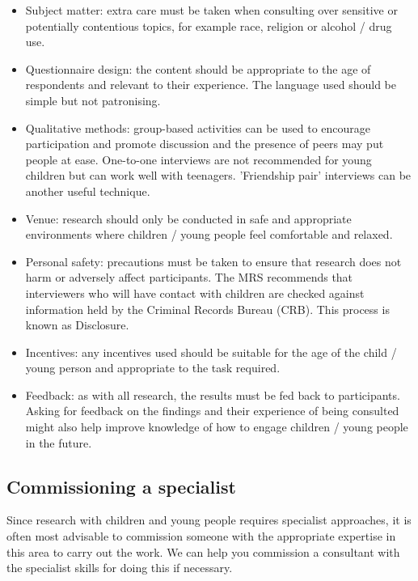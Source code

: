 \begin{itemize}
	\item Subject matter: extra care must be taken when consulting over sensitive or potentially contentious topics, for example race, religion or alcohol / drug use.

	\item Questionnaire design: the content should be appropriate to the age of respondents and relevant to their experience. The language used should be simple but not patronising.

	\item Qualitative methods: group-based activities can be used to encourage participation and promote discussion and the presence of peers may put people at ease. One-to-one interviews are not recommended for young children but can work well with teenagers. 'Friendship pair' interviews can be another useful technique.

	\item Venue: research should only be conducted in safe and appropriate environments where children / young people feel comfortable and relaxed.

	\item Personal safety: precautions must be taken to ensure that research does not harm or adversely affect participants. The MRS recommends that interviewers who will have contact with children are checked against information held by the Criminal Records Bureau (CRB). This process is known as Disclosure.

	\item Incentives: any incentives used should be suitable for the age of the child / young person and appropriate to the task required.

	\item Feedback: as with all research, the results must be fed back to participants. Asking for feedback on the findings and their experience of being consulted might also help improve knowledge of how to engage children / young people in the future.

\end{itemize}

\subsection{Commissioning a specialist}

Since research with children and young people requires specialist approaches, it is often most advisable to commission someone with the appropriate expertise in this area to carry out the work. We can help you commission a consultant with the specialist skills for doing this if necessary.

